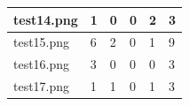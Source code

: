 \documentclass[a4paper,12pt]{article}
\begin{document}
\begin{table}[H]
\begin{tabular}{llllll}
		\multicolumn{1}{|l|}{test14.png}                                                                       & \multicolumn{1}{l|}{1}                                                                 & \multicolumn{1}{l|}{0}                                                                  & \multicolumn{1}{l|}{0}                                                                  & \multicolumn{1}{l|}{2}                                                                                      & \multicolumn{1}{l|}{3}                                                                                             \\ \hline
		\multicolumn{1}{|l|}{test15.png}                                                                       & \multicolumn{1}{l|}{6}                                                                 & \multicolumn{1}{l|}{2}                                                                  & \multicolumn{1}{l|}{0}                                                                  & \multicolumn{1}{l|}{1}                                                                                      & \multicolumn{1}{l|}{9}                                                                                             \\ \hline
		\multicolumn{1}{|l|}{test16.png}                                                                       & \multicolumn{1}{l|}{3}                                                                 & \multicolumn{1}{l|}{0}                                                                  & \multicolumn{1}{l|}{0}                                                                  & \multicolumn{1}{l|}{0}                                                                                      & \multicolumn{1}{l|}{3}                                                                                             \\ \hline
		\multicolumn{1}{|l|}{test17.png}                                                                       & \multicolumn{1}{l|}{1}                                                                 & \multicolumn{1}{l|}{1}                                                                  & \multicolumn{1}{l|}{0}                                                                  & \multicolumn{1}{l|}{1}                                                                                      & \multicolumn{1}{l|}{3}                                                                                             \\ \hline

\end{tabular}
\end{table}
\end{document}
